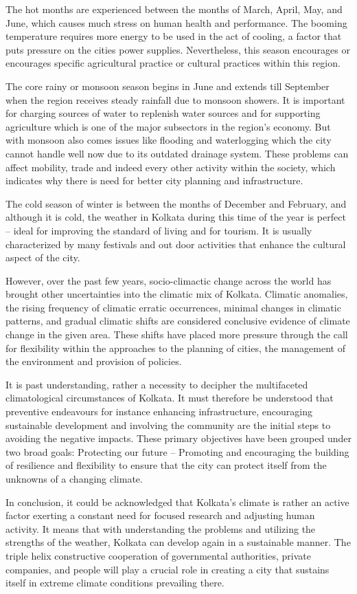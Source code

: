 \documentclass[12pt, a4paper]{article}
\begin{document}
The hot months are experienced between the months of March, April, May, and June, which causes much stress on human health and performance. The booming temperature requires more energy to be used in the act of cooling, a factor that puts pressure on the cities power supplies. Nevertheless, this season encourages or encourages specific agricultural practice or cultural practices within this region.

The core rainy or monsoon season begins in June and extends till September when the region receives steady rainfall due to monsoon showers. It is important for charging sources of water to replenish water sources and for supporting agriculture which is one of the major subsectors in the region’s economy. But with monsoon also comes issues like flooding and waterlogging which the city cannot handle well now due to its outdated drainage system. These problems can affect mobility, trade and indeed every other activity within the society, which indicates why there is need for better city planning and infrastructure.

The cold season of winter is between the months of December and February, and although it is cold, the weather in Kolkata during this time of the year is perfect – ideal for improving the standard of living and for tourism. It is usually characterized by many festivals and out door activities that enhance the cultural aspect of the city.

However, over the past few years, socio-climactic change across the world has brought other uncertainties into the climatic mix of Kolkata. Climatic anomalies, the rising frequency of climatic erratic occurrences, minimal changes in climatic patterns, and gradual climatic shifts are considered conclusive evidence of climate change in the given area. These shifts have placed more pressure through the call for flexibility within the approaches to the planning of cities, the management of the environment and provision of policies.

It is past understanding, rather a necessity to decipher the multifaceted climatological circumstances of Kolkata. It must therefore be understood that preventive endeavours for instance enhancing infrastructure, encouraging sustainable development and involving the community are the initial steps to avoiding the negative impacts. These primary objectives have been grouped under two broad goals: Protecting our future – Promoting and encouraging the building of resilience and flexibility to ensure that the city can protect itself from the unknowns of a changing climate.

In conclusion, it could be acknowledged that Kolkata’s climate is rather an active factor exerting a constant need for focused research and adjusting human activity. It means that with understanding the problems and utilizing the strengths of the weather, Kolkata can develop again in a sustainable manner. The triple helix constructive cooperation of governmental authorities, private companies, and people will play a crucial role in creating a city that sustains itself in extreme climate conditions prevailing there.

\newpage


\end{document}
